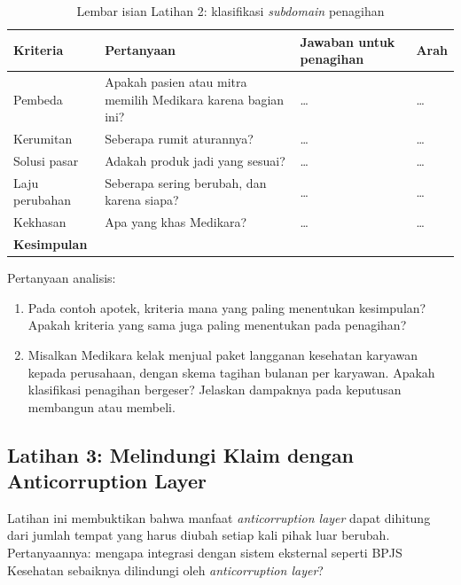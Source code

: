 \begin{table}[!htb]
  \centering
  \caption{Lembar isian Latihan 2: klasifikasi \textit{subdomain} penagihan}
  \label{tab:ch06-lat2-hasil}
  \footnotesize
  \begin{tabularx}{\textwidth}{>{\raggedright\arraybackslash}p{2.0cm} >{\raggedright\arraybackslash}X >{\raggedright\arraybackslash}X >{\raggedright\arraybackslash}p{2.0cm}}
    \hline
    \textbf{Kriteria} & \textbf{Pertanyaan} & \textbf{Jawaban untuk penagihan} & \textbf{Arah} \\
      \hline
    Pembeda & Apakah pasien atau mitra memilih Medikara karena bagian ini? & \dots & \dots \\
      \hline
    Kerumitan & Seberapa rumit aturannya? & \dots & \dots \\ \hline
    Solusi pasar & Adakah produk jadi yang sesuai? & \dots & \dots \\ \hline
    Laju perubahan & Seberapa sering berubah, dan karena siapa? & \dots & \dots \\ \hline
    Kekhasan & Apa yang khas Medikara? & \dots & \dots \\ \hline
    \textbf{Kesimpulan} & \multicolumn{3}{>{\raggedright\arraybackslash}p{8.2cm}}{\dots} \\
      \hline
  \end{tabularx}
\end{table}

Pertanyaan analisis:
\begin{enumerate}
  \item Pada contoh apotek, kriteria mana yang paling menentukan kesimpulan? Apakah kriteria yang
        sama juga paling menentukan pada penagihan?
  \item Misalkan Medikara kelak menjual paket langganan kesehatan karyawan kepada perusahaan, dengan
        skema tagihan bulanan per karyawan. Apakah klasifikasi penagihan bergeser? Jelaskan
        dampaknya pada keputusan membangun atau membeli.
\end{enumerate}

\subsection*{Latihan 3: Melindungi Klaim dengan Anticorruption Layer}

Latihan ini membuktikan bahwa manfaat \textit{anticorruption layer} dapat dihitung dari jumlah
tempat yang harus diubah setiap kali pihak luar berubah. Pertanyaannya: mengapa integrasi dengan
sistem eksternal seperti BPJS Kesehatan sebaiknya dilindungi oleh \textit{anticorruption layer}?


